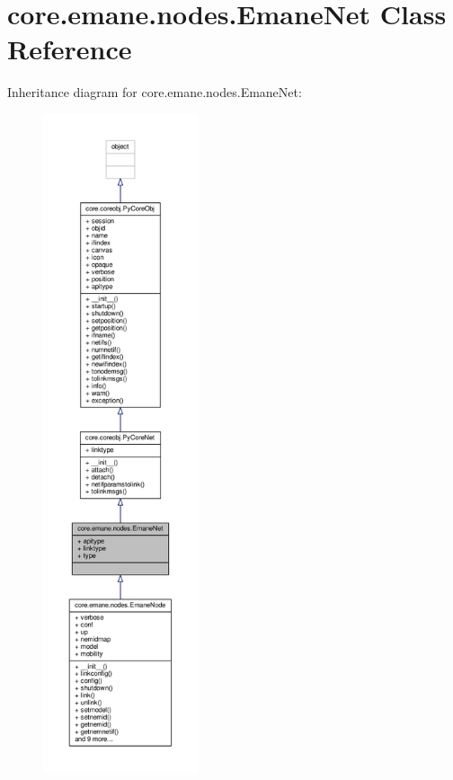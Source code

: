 \hypertarget{classcore_1_1emane_1_1nodes_1_1_emane_net}{\section{core.\+emane.\+nodes.\+Emane\+Net Class Reference}
\label{classcore_1_1emane_1_1nodes_1_1_emane_net}
}


Inheritance diagram for core.\+emane.\+nodes.\+Emane\+Net\+:
\nopagebreak
\begin{figure}[H]
\begin{center}
\leavevmode
\includegraphics[height=550pt]{classcore_1_1emane_1_1nodes_1_1_emane_net__inherit__graph}
\end{center}
\end{figure}


